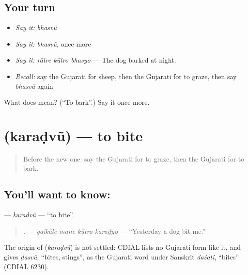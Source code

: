 \subsection*{Your turn}
\begin{itemize}
\raggedright
  \item \emph{Say it:} \emph{bhasvũ}
  \item \emph{Say it:} \emph{bhasvũ}, once more
  \item \emph{Say it:} \emph{rātre kūtro bhasyo} — The dog barked at night.
  \item \emph{Recall:} say the Gujarati for sheep, then the Gujarati for to graze, then say \emph{bhasvũ} again
\end{itemize}

\begin{tcolorbox}[breakable,colback=teal!4,colframe=teal!35!black,title={Before you move on}]
What does  mean? (\textquotedblleft{}To bark\textquotedblright{}.) Say it once more.
\end{tcolorbox}
\section[\texorpdfstring{\gu{કરડવું} (karaḍvũ)}{કરડવું (karaḍvũ)}]{ (karaḍvũ) — to bite}

\label{lesson:GU-C235-karadvu}



\begin{quote}
Before the new one: say the Gujarati for to graze, then the Gujarati for to bark.
\end{quote}

\subsection*{You'll want to know: }
\textbf{} — \emph{karaḍvũ} — \textquotedblleft{}to bite\textquotedblright{}.

\begin{quote}
\textbf{   .} — \emph{gaīkāle mane kūtro karaḍyo} — \textquotedblleft{}Yesterday a dog bit me.\textquotedblright{}
\end{quote}

\begin{cousinweb}
The origin of \textbf{} (\emph{karaḍvũ}) is not settled: CDIAL lists no Gujarati form like it, and gives \emph{ḍasvũ}, \textquotedblleft{}bites, stings\textquotedblright{}, as the Gujarati word under Sanskrit \emph{daśati}, \textquotedblleft{}bites\textquotedblright{} (CDIAL 6230).
\end{cousinweb}

